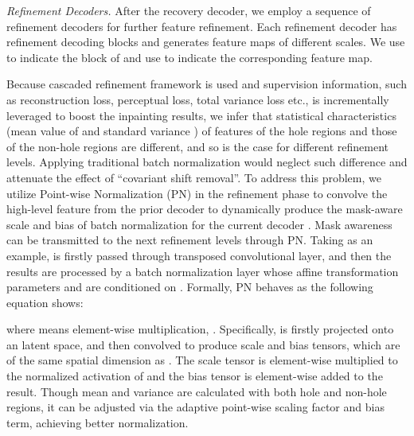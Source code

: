 \documentclass[journal]{IEEEtran}
\begin{document}
\textit{Refinement Decoders.}
After the recovery decoder, we employ a sequence of refinement decoders  for further feature refinement. Each refinement decoder has  refinement decoding blocks and generates  feature maps of different scales. 
We use  to indicate the  block of  and use  to indicate the corresponding  feature map. 

Because cascaded refinement framework is used and supervision information, such as reconstruction loss, perceptual loss, total variance loss etc., is incrementally leveraged to boost the inpainting results, we infer that statistical characteristics (mean value of  and standard variance ) of features of the hole regions and those of the non-hole regions are different, and so is the case for different refinement levels. Applying traditional batch normalization would neglect such difference and attenuate the effect of ``covariant shift removal''. To address this problem, we utilize Point-wise Normalization (PN) in the refinement phase to convolve the high-level feature  from the prior decoder  to dynamically produce the mask-aware scale and bias of batch normalization for the current decoder . Mask awareness can be transmitted to the next refinement levels through PN.
Taking  as an example,  is firstly passed through transposed convolutional layer, and then the results  are processed by a batch normalization layer whose affine transformation parameters  and  are conditioned on . 
Formally, PN behaves as the following equation shows:

where  means element-wise multiplication, {\color{black}{ in the input to PN and  is its output}}.
Specifically,  is firstly projected onto an latent space, and then convolved to produce scale and bias tensors, which are of the same spatial dimension as . The scale tensor is element-wise multiplied to the normalized activation of  and the bias tensor is element-wise added to the result. Though mean and variance are calculated with both hole and non-hole regions, it can be adjusted via the adaptive point-wise scaling factor and bias term, achieving better normalization. 

{}
\end{document}
